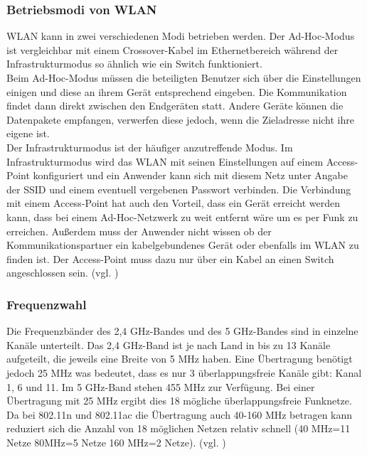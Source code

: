 \subsubsection{Betriebsmodi von WLAN}
WLAN kann in zwei verschiedenen Modi betrieben werden. Der Ad-Hoc-Modus ist vergleichbar mit einem Crossover-Kabel im Ethernetbereich während der Infrastrukturmodus so ähnlich wie ein Switch funktioniert.\\
Beim Ad-Hoc-Modus müssen die beteiligten Benutzer sich über die Einstellungen einigen und diese an ihrem Gerät entsprechend eingeben. Die Kommunikation findet dann direkt zwischen den Endgeräten statt. Andere Geräte können die Datenpakete empfangen, verwerfen diese jedoch, wenn die Zieladresse nicht ihre eigene ist.\\
Der Infrastrukturmodus ist der häufiger anzutreffende Modus. Im Infrastrukturmodus wird das WLAN mit seinen Einstellungen auf einem Access-Point konfiguriert und ein Anwender kann sich mit diesem Netz unter Angabe der \ac{SSID} und einem eventuell vergebenen Passwort verbinden. Die Verbindung mit einem Access-Point hat auch den Vorteil, dass ein Gerät erreicht werden kann, dass bei einem Ad-Hoc-Netzwerk zu weit entfernt wäre um es per Funk zu erreichen. Außerdem muss der Anwender nicht wissen ob der Kommunikationspartner ein kabelgebundenes Gerät oder ebenfalls im WLAN zu finden ist. Der Access-Point muss dazu nur über ein Kabel an einen Switch angeschlossen sein. (vgl. \cite{SWB-430171331})

\subsubsection{Frequenzwahl}
Die Frequenzbänder des 2,4 GHz-Bandes und des 5 GHz-Bandes sind in einzelne Kanäle unterteilt. Das 2,4 GHz-Band ist je nach Land in bis zu 13 Kanäle aufgeteilt, die jeweils eine Breite von 5 MHz haben. Eine Übertragung benötigt jedoch 25 MHz was bedeutet, dass es nur 3 überlappungsfreie Kanäle gibt: Kanal 1, 6 und 11. Im 5 GHz-Band stehen 455 MHz zur Verfügung. Bei einer Übertragung mit 25 MHz ergibt dies 18 mögliche überlappungsfreie Funknetze. Da bei 802.11n und 802.11ac die Übertragung auch 40-160 MHz betragen kann reduziert sich die Anzahl von 18 möglichen Netzen relativ schnell (40 MHz=11 Netze 80MHz=5 Netze 160 MHz=2 Netze). (vgl. \cite{SWB-430171331})

